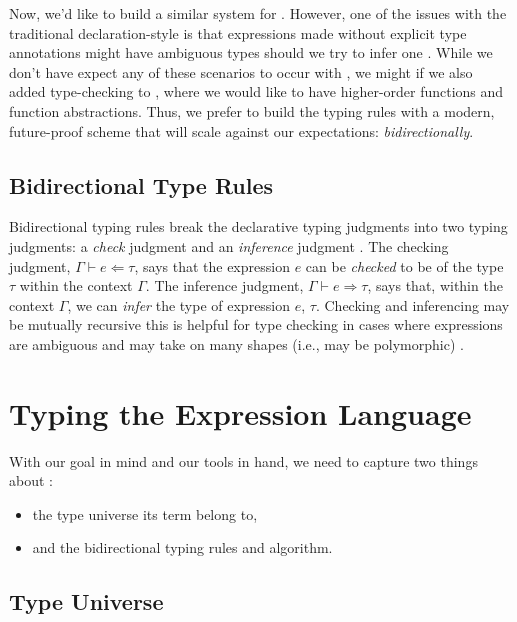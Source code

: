 Now, we'd like to build a similar system for \Expr{}. However, one of the issues
with the traditional declaration-style is that expressions made without explicit
type annotations might have ambiguous types should we try to infer one
\cite{nlab:bidirectional_typechecking}. While we don't have expect any of these
scenarios to occur with \Expr{}, we might if we also added type-checking to
\ModelExpr{}, where we would like to have higher-order functions and function
abstractions. Thus, we prefer to build the typing rules with a modern,
future-proof scheme that will scale against our expectations: \textit{bidirectionally}.

\subsection{Bidirectional Type Rules}
\label{chap:typed-expr:sec:type-safe-expressions:subsec:bidirectional-type-rules}

Bidirectional typing rules break the declarative typing judgments into two
typing judgments: a \textit{check} judgment and an \textit{inference} judgment
\cite{Christiansen2013}. The checking judgment, \(\Gamma{} \vdash{} e \Leftarrow
\tau{}\), says that the expression \(e\) can be \textit{checked} to be of the
type \(\tau\) within the context \(\Gamma\). The inference judgment, \(\Gamma{}
\vdash{} e \Rightarrow \tau{}\), says that, within the context \(\Gamma\), we
can \textit{infer} the type of expression \(e\), \(\tau\). Checking and
inferencing may be mutually recursive \textemdash{} this is helpful for type
checking in cases where expressions are ambiguous and may take on many shapes
(i.e., may be polymorphic) \cite{nlab:bidirectional_typechecking}.

\section{Typing the Expression Language}
\label{chap:typed-expr:sec:typing-the-expression-language}

With our goal in mind and our tools in hand, we need to capture two things about
\Expr{}:
\begin{itemize}
      \item the type universe its term belong to,
      \item and the bidirectional typing rules and algorithm.
\end{itemize}

\subsection{Type Universe}
\label{chap:typed-expr:sec:typing-the-expression-language:subsec:type-universe}

